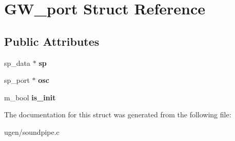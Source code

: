 \hypertarget{structGW__port}{}\section{G\+W\+\_\+port Struct Reference}
\label{structGW__port}
\subsection*{Public Attributes}
\begin{DoxyCompactItemize}
\item 
\hypertarget{structGW__port_ab96233cdb8a9e60c8bb5b861a615dea7}{}\label{structGW__port_ab96233cdb8a9e60c8bb5b861a615dea7} 
sp\+\_\+data $\ast$ {\bfseries sp}
\item 
\hypertarget{structGW__port_a6f3b798c87e9e364209d5785a37e2928}{}\label{structGW__port_a6f3b798c87e9e364209d5785a37e2928} 
sp\+\_\+port $\ast$ {\bfseries osc}
\item 
\hypertarget{structGW__port_aceb84a5abd354f11e070c1ef6cc935b2}{}\label{structGW__port_aceb84a5abd354f11e070c1ef6cc935b2} 
m\+\_\+bool {\bfseries is\+\_\+init}
\end{DoxyCompactItemize}


The documentation for this struct was generated from the following file\+:\begin{DoxyCompactItemize}
\item 
ugen/soundpipe.\+c\end{DoxyCompactItemize}

